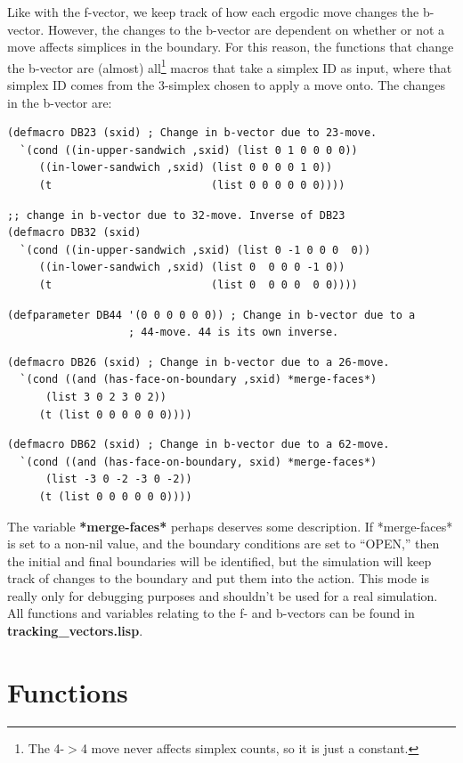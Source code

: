 \message{ !name(programmers_guide.tex)}\documentclass[12pt]{article}
\begin{document}
Like with the f-vector, we keep track of how each ergodic move changes
the b-vector. However, the changes to the b-vector are dependent on
whether or not a move affects simplices in the boundary. For this
reason, the functions that change the b-vector are (almost)
all\footnote{The 4-$>$4 move never affects simplex counts, so it is
  just a constant.} macros that take a simplex ID as input, where that
simplex ID comes from the 3-simplex chosen to apply a move onto. The changes in the b-vector are:
\begin{lstlisting}
(defmacro DB23 (sxid) ; Change in b-vector due to 23-move.
  `(cond ((in-upper-sandwich ,sxid) (list 0 1 0 0 0 0))
	 ((in-lower-sandwich ,sxid) (list 0 0 0 0 1 0))
	 (t                         (list 0 0 0 0 0 0))))
\end{lstlisting}
\begin{lstlisting}
;; change in b-vector due to 32-move. Inverse of DB23
(defmacro DB32 (sxid) 
  `(cond ((in-upper-sandwich ,sxid) (list 0 -1 0 0 0  0))
	 ((in-lower-sandwich ,sxid) (list 0  0 0 0 -1 0))
	 (t                         (list 0  0 0 0  0 0))))
\end{lstlisting}
\begin{lstlisting}
(defparameter DB44 '(0 0 0 0 0 0)) ; Change in b-vector due to a
				   ; 44-move. 44 is its own inverse.
\end{lstlisting}
\begin{lstlisting}
(defmacro DB26 (sxid) ; Change in b-vector due to a 26-move.
  `(cond ((and (has-face-on-boundary ,sxid) *merge-faces*)
	  (list 3 0 2 3 0 2))
	 (t (list 0 0 0 0 0 0))))
\end{lstlisting}
\begin{lstlisting}
(defmacro DB62 (sxid) ; Change in b-vector due to a 62-move.
  `(cond ((and (has-face-on-boundary, sxid) *merge-faces*)
	  (list -3 0 -2 -3 0 -2))
	 (t (list 0 0 0 0 0 0))))
\end{lstlisting}

The variable \textbf{*merge-faces*} perhaps deserves some
description. If *merge-faces* is set to a non-nil value, and the
boundary conditions are set to ``OPEN,'' then the initial and final
boundaries will be identified, but the simulation will keep track of
changes to the boundary and put them into the action. This mode is
really only for debugging purposes and shouldn't be used for a real
simulation. All functions and variables relating to the f- and
b-vectors can be found in \textbf{tracking\_vectors.lisp}.


\section{Functions}
\label{s:functions}
\end{document}
